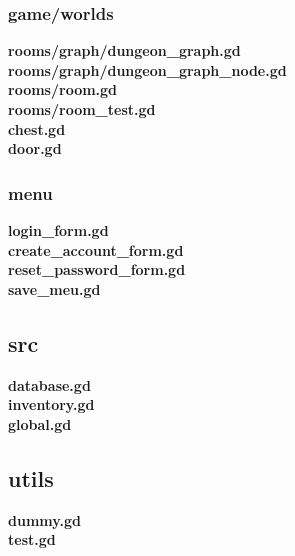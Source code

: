 \documentclass{article}
\begin{document}
\subsubsection{game/worlds}
\textbf{rooms/graph/dungeon\_graph.gd}\\

\textbf{rooms/graph/dungeon\_graph\_node.gd}\\

\textbf{rooms/room.gd}\\

\textbf{rooms/room\_test.gd}\\

\textbf{chest.gd}\\

\textbf{door.gd}\\

\subsubsection{menu}
\textbf{login\_form.gd}\\

\textbf{create\_account\_form.gd}\\

\textbf{reset\_password\_form.gd}\\

\textbf{save\_meu.gd}\\

\subsection{src}
\textbf{database.gd}\\

\textbf{inventory.gd}\\

\textbf{global.gd}\\

\subsection{utils}
\textbf{dummy.gd}\\

\textbf{test.gd}\\

\restoregeometry
\end{document}
